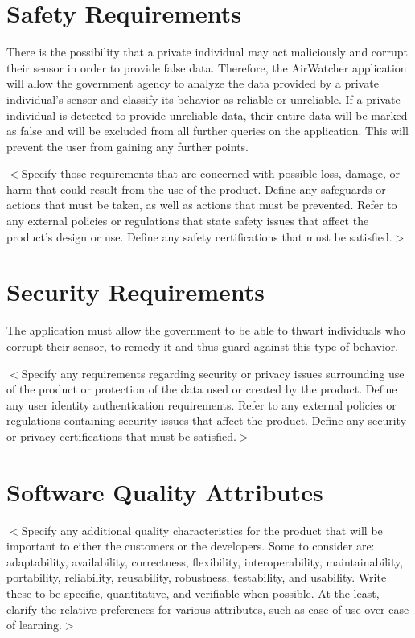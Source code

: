 \documentclass{report}
\begin{document}
\section{Safety Requirements}
There is the possibility that a private individual may act maliciously and corrupt their sensor in order
to provide false data. Therefore, the AirWatcher application will allow the government agency to
analyze the data provided by a private individual’s sensor and classify its behavior as reliable or
unreliable. If a private individual is detected to provide unreliable data, their entire data will be
marked as false and will be excluded from all further queries on the application. This will prevent the
user from gaining any further points.

$<$Specify those requirements that are concerned with possible loss, damage, or
harm that could result from the use of the product. Define any safeguards or
actions that must be taken, as well as actions that must be prevented. Refer to
any external policies or regulations that state safety issues that affect the
product’s design or use. Define any safety certifications that must be
satisfied.$>$

\section{Security Requirements}
The application must allow the government to be able to thwart individuals who
corrupt their sensor, to remedy it and thus guard against this type of behavior.

$<$Specify any requirements regarding security or privacy issues surrounding use
of the product or protection of the data used or created by the product. Define
any user identity authentication requirements. Refer to any external policies or
regulations containing security issues that affect the product. Define any
security or privacy certifications that must be satisfied.$>$

\section{Software Quality Attributes}
$<$Specify any additional quality characteristics for the product that will be
important to either the customers or the developers. Some to consider are:
adaptability, availability, correctness, flexibility, interoperability,
maintainability, portability, reliability, reusability, robustness, testability,
and usability. Write these to be specific, quantitative, and verifiable when
possible. At the least, clarify the relative preferences for various attributes,
such as ease of use over ease of learning.$>$
\end{document}
